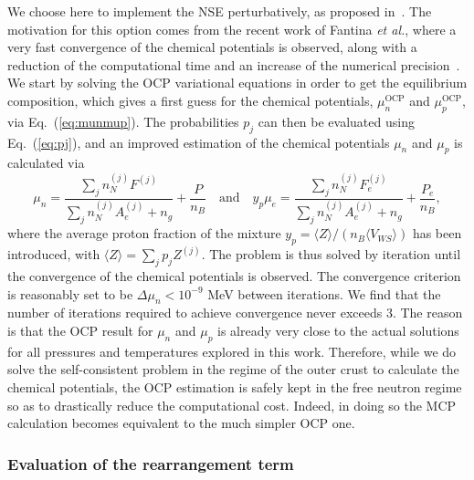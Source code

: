 We choose here to implement the NSE perturbatively, as proposed 
in~\cite{Grams2018}. 
The motivation for this option comes from the recent work of Fantina 
\textit{et al.}, where a very fast convergence of the chemical potentials is 
observed, along with a reduction of the computational time and an increase of
the numerical precision~\cite{Fantina2020}.
We start by solving the OCP variational equations in order to get the 
equilibrium composition, which gives a first guess for the chemical potentials,
$\mu_n^{\text{OCP}}$ and $\mu_p^{\text{OCP}}$, via Eq.~(\ref{eq:munmup}). 
The probabilities $p_j$ can then be evaluated using Eq.~(\ref{eq:pj}), and an
improved estimation of the chemical potentials $\mu_n$ and $\mu_p$ is
calculated via
%
\begin{equation}
  \mu_n = \frac{\sum_j n_N^{(j)}F^{(j)}}{\sum_j n_N^{(j)}A_e^{(j)} + n_g} +
  \frac{P}{n_B} \quad \text{and} \quad
  y_p\mu_e = \frac{\sum_j n_N^{(j)}F_e^{(j)}}{\sum_j n_N^{(j)}A_e^{(j)} + n_g} 
  + \frac{P_e}{n_B},
\end{equation}
%
where the average proton fraction of the mixture $y_p=\langle
Z\rangle/(n_B\langle V_{WS}\rangle)$ has been introduced, with 
$\langle Z \rangle = \sum_j p_j Z^{(j)}$. The problem is thus solved by
iteration until the convergence of the chemical potentials is observed. The
convergence criterion is reasonably set to be $\Delta \mu_n < 10^{-9}$ MeV
between iterations.
We find that the number of iterations required to achieve convergence never 
exceeds 3. The reason is that the OCP result for $\mu_n$ and $\mu_p$ is 
already very close to the actual solutions for all pressures and 
temperatures explored in this work. Therefore, while we do solve the 
self-consistent problem in the regime of the outer crust to calculate the 
chemical potentials, the OCP estimation is safely kept in the free neutron 
regime so as to drastically reduce the computational cost. Indeed, in doing so 
the MCP calculation becomes equivalent to the much simpler OCP one.

\subsubsection{Evaluation of the rearrangement term}\label{subsubsec:rear}


